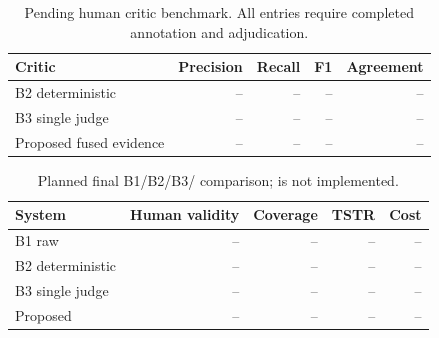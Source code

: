\begin{table}[t]
  \centering
  \caption{Pending human critic benchmark. All entries require completed
  annotation and adjudication.}
  \label{tab:future-human-benchmark}
  \begin{tabular}{@{}lrrrr@{}}
    \toprule
    Critic & Precision & Recall & F1 & Agreement \\
    \midrule
    B2 deterministic & -- & -- & -- & -- \\
    B3 single judge & -- & -- & -- & -- \\
    Proposed fused evidence & -- & -- & -- & -- \\
    \bottomrule
  \end{tabular}
\end{table}

\begin{table}[t]
  \centering
  \caption{Planned final B1/B2/B3/\rcqasyn{} comparison; \rcqasyn{} is not
  implemented.}
  \label{tab:future-baselines}
  \begin{tabular}{@{}lrrrr@{}}
    \toprule
    System & Human validity & Coverage & TSTR & Cost \\
    \midrule
    B1 raw & -- & -- & -- & -- \\
    B2 deterministic & -- & -- & -- & -- \\
    B3 single judge & -- & -- & -- & -- \\
    Proposed \rcqasyn{} & -- & -- & -- & -- \\
    \bottomrule
  \end{tabular}
\end{table}

